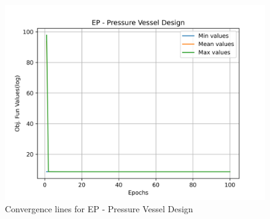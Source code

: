 \begin{figure}[H]
        \centering
        \caption{Convergence lines for EP - Pressure Vessel Design}
        \label{fig:pressure_vessel_problem_solve_ep}
        \includegraphics[scale=0.5]{images/pressure_vessel_problem_solve_ep.png}
        \end{figure}
        
